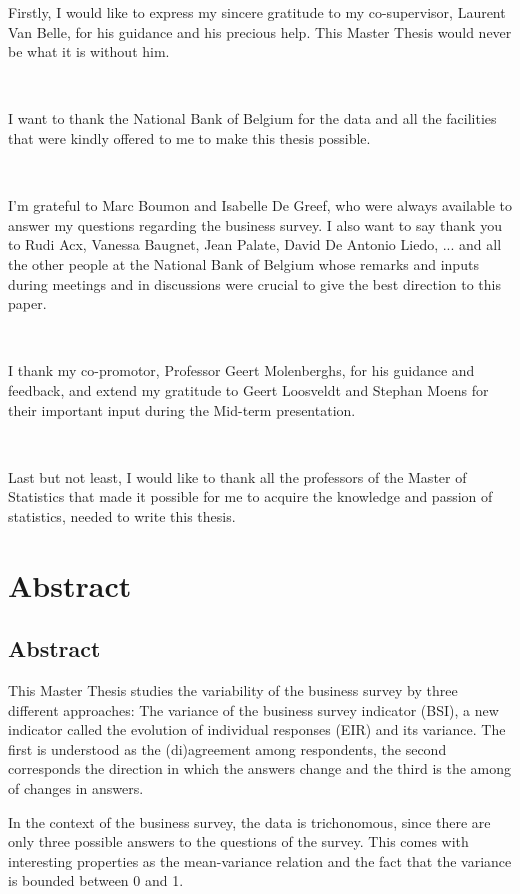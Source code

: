 \documentclass[12pt,a4paper,oneside]{book}
\begin{document}
Firstly, I would like to express my sincere gratitude to my co-supervisor, Laurent Van Belle, for his guidance and his precious help. This Master Thesis would never be what it is without him. 

\ 

I want to thank the National Bank of Belgium for the data and all the facilities that were kindly offered to me to make this thesis possible.

\

I'm grateful to Marc Boumon and Isabelle De Greef, who were always available to answer my questions regarding the business survey. 
I also want to say thank you to Rudi Acx, Vanessa Baugnet, Jean Palate, David De Antonio Liedo, ... and all the other people at the National Bank of Belgium whose remarks and inputs during meetings and in discussions were crucial to give the best direction to this paper. 

\

I thank my co-promotor, Professor Geert Molenberghs, for his guidance and feedback, and extend my gratitude to Geert Loosveldt and Stephan Moens for their important input during the Mid-term presentation.

\

Last but not least, I would like to thank all the professors of the Master of Statistics that made it possible for me to acquire the knowledge and passion of statistics, needed to write this thesis. 


\chapter*{Abstract}


\section*{Abstract}

This Master Thesis studies the variability of the business survey by three different approaches: 
The variance of the business survey indicator (BSI), a new indicator called the evolution of individual responses (EIR) and its variance.
The first is understood as the (di)agreement among respondents, the second corresponds the direction in which the answers change and the third is the among of changes in answers.


In the context of the business survey, the data is trichonomous, since there are only three possible answers to the questions of the survey. This comes with interesting properties as the mean-variance relation and the fact that the variance is bounded between 0 and 1.
\end{document}
